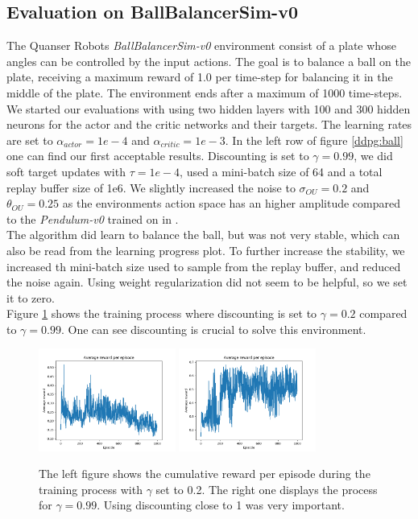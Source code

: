 \subsection{Evaluation on BallBalancerSim-v0}
The Quanser Robots \textit{BallBalancerSim-v0} environment consist of a plate whose angles can be controlled by the input actions. The goal is to balance a ball on the plate, receiving a maximum reward of 1.0 per time-step for balancing it in the middle of the plate. The environment ends after a maximum of 1000 time-steps.\\
We started our evaluations with using two hidden layers with 100 and 300 hidden neurons for the actor and the critic networks and their targets. The learning rates are set to $\alpha_{actor}=1e-4$ and $\alpha_{critic}=1e-3$. 
In the left row of figure \ref{ddpg:ball} one can find our first acceptable results. Discounting is set to $\gamma=0.99$, we did soft target updates with $\tau=1e-4$, used a mini-batch size of 64 and a total replay buffer size of 1e6. We slightly increased the noise to $\sigma_{OU}=0.2$ and $\theta_{OU}=0.25$ as the environments action space has an higher amplitude compared to the \textit{Pendulum-v0} trained on in \citep{lillicrap2015continuous}.\\
The algorithm did learn to balance the ball, but was not very stable, which can also be read from the learning progress plot. To further increase the stability, we increased th mini-batch size used to sample from the replay buffer, and reduced the noise again. Using weight regularization did not seem to be helpful, so we set it to zero.\\
Figure \ref{ddpg:ball:gamma} shows the training process where discounting is set to $\gamma=0.2$ compared to $\gamma=0.99$. One can see discounting is crucial to solve this environment.\\
\begin{figure}[H]
	\centering
	\includegraphics[width=0.4\textwidth]{plots/ddpg_ball_low_gamma.png}
	\includegraphics[width=0.4\textwidth]{plots/ddpg_ball_high_gamma.png}
	\caption{The left figure shows the cumulative reward per episode during the training process with $\gamma$ set to 0.2. The right one displays the process for $\gamma=0.99$. Using discounting close to 1 was very important.}
	\label{ddpg:ball:gamma}
\end{figure}
